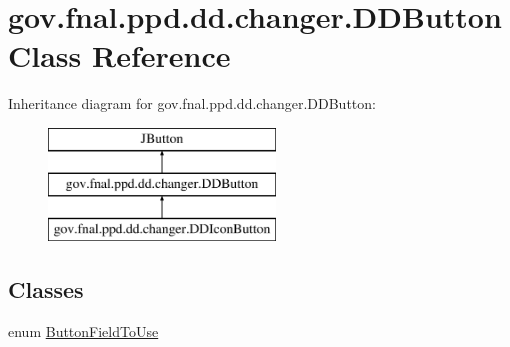 \hypertarget{classgov_1_1fnal_1_1ppd_1_1dd_1_1changer_1_1DDButton}{\section{gov.\-fnal.\-ppd.\-dd.\-changer.\-D\-D\-Button Class Reference}
\label{classgov_1_1fnal_1_1ppd_1_1dd_1_1changer_1_1DDButton}
}
Inheritance diagram for gov.\-fnal.\-ppd.\-dd.\-changer.\-D\-D\-Button\-:\begin{figure}[H]
\begin{center}
\leavevmode
\includegraphics[height=3.000000cm]{classgov_1_1fnal_1_1ppd_1_1dd_1_1changer_1_1DDButton}
\end{center}
\end{figure}
\subsection*{Classes}
\begin{DoxyCompactItemize}
\item 
enum \hyperlink{enumgov_1_1fnal_1_1ppd_1_1dd_1_1changer_1_1DDButton_1_1ButtonFieldToUse}{Button\-Field\-To\-Use}
\end{DoxyCompactItemize}
